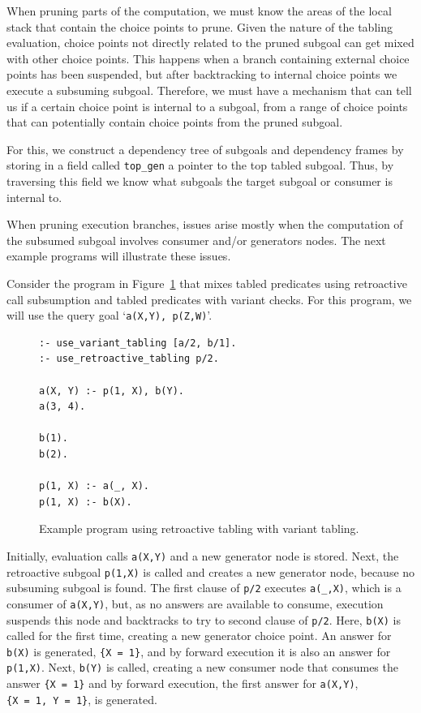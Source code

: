 When pruning parts of the computation, we must know the areas of the local stack
that contain the choice points to prune. Given the nature of the tabling evaluation, choice points not
directly related to the pruned subgoal can get mixed with other choice points. This happens when a branch
containing external choice points has been suspended, but after backtracking to internal choice points we
execute a subsuming subgoal. Therefore, we must have a mechanism that can tell us if a certain choice
point is internal to a subgoal, from a range of choice points that can potentially contain choice points from
the pruned subgoal.

For this, we construct a dependency tree of subgoals and dependency frames by storing in a field
called \texttt{top\_gen} a pointer to the top tabled subgoal. Thus, by traversing this field we know
what subgoals the target subgoal or consumer is internal to.

When pruning execution branches, issues arise mostly when the computation of the subsumed subgoal involves
consumer and/or generators nodes. The next example programs will illustrate these issues.

Consider the program in Figure~\ref{fig:retro_program2} that mixes tabled predicates using retroactive
call subsumption and tabled predicates with variant checks.
For this program, we will use the query goal `\texttt{a(X,Y),~p(Z,W)}'.

\begin{figure}[ht]
\begin{Verbatim}
:- use_variant_tabling [a/2, b/1].
:- use_retroactive_tabling p/2.

a(X, Y) :- p(1, X), b(Y).
a(3, 4).

b(1).
b(2).

p(1, X) :- a(_, X).
p(1, X) :- b(X).
\end{Verbatim}
\caption{Example program using retroactive tabling with variant tabling.}
\label{fig:retro_program2}
\end{figure}

Initially, evaluation calls \texttt{a(X,Y)} and a new generator node is stored. Next, the retroactive subgoal
\texttt{p(1,X)} is called and creates a new generator node, because no subsuming subgoal is found.
The first clause of \texttt{p/2} executes \texttt{a(\_,X)}, which is a consumer of \texttt{a(X,Y)}, but, as
no answers are available to consume, execution suspends this node and backtracks to try to second clause
of \texttt{p/2}. Here, \texttt{b(X)} is called for the first time, creating a new generator choice point.
An answer for \texttt{b(X)} is generated, \texttt{\{X~=~1\}}, and by forward execution it is also an answer
for \texttt{p(1,X)}. Next, \texttt{b(Y)} is called, creating a new consumer node that consumes the answer
\texttt{\{X~=~1\}} and by forward execution, the first answer for \texttt{a(X,Y)}, \texttt{\{X~=~1,~Y~=~1\}},
is generated.

